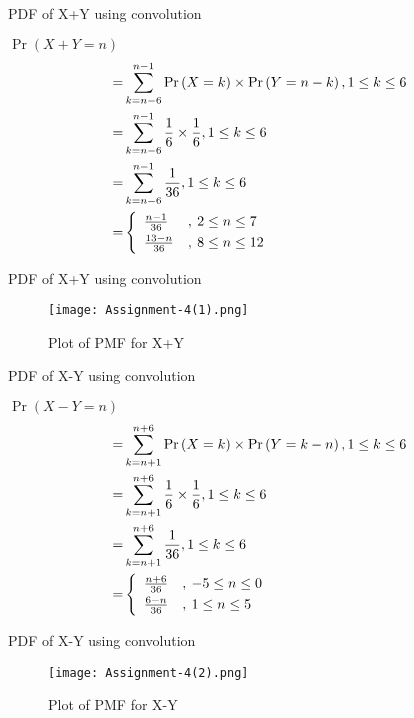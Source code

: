 \documentclass{beamer}
\providecommand{\brak}[1]{\ensuremath{\left(#1\right)}}
\begin{document}
\begin{frame}{PDF of X+Y using convolution}
    \begin{block}{}
        $\Pr\brak{X+Y=n}$
        \begin{align}
            =&\sum_{k=n-6}^{n-1} \Pr\brak{X=k}\times\Pr\brak{Y=n-k}, 1\leq k \leq 6\\
            =&\sum_{k=n-6}^{n-1} \frac{1}{6}\times\frac{1}{6}, 1\leq k \leq 6\\
            =&\sum_{k=n-6}^{n-1} \frac{1}{36}, 1\leq k \leq 6\\
            =&
            \left\{
	        \begin{array}{ll}
		        \frac{n-1}{36}  & ,\: 2 \leq n \leq 7 \smallskip\\
		        \frac{13-n}{36} & ,\: 8 \leq n \leq 12
	        \end{array}
            \right.\label{0.0.8}
        \end{align}
    \end{block}
\end{frame}
\begin{frame}{PDF of X+Y using convolution}
    \begin{figure}[htb]
        \texttt{[image: Assignment-4(1).png]}
        \caption{Plot of PMF for X+Y}
    \end{figure}
\end{frame}
\begin{frame}{PDF of X-Y using convolution}
    \begin{block}{}
        $\Pr\brak{X-Y=n}$
        \begin{align}
            =&\sum_{k=n+1}^{n+6} \Pr\brak{X=k}\times\Pr\brak{Y=k-n}, 1\leq k \leq 6\\
            =&\sum_{k=n+1}^{n+6} \frac{1}{6}\times\frac{1}{6}, 1\leq k \leq 6\\
            =&\sum_{k=n+1}^{n+6} \frac{1}{36}, 1\leq k \leq 6\\
            =&
            \left\{
	        \begin{array}{ll}
		        \frac{n+6}{36} & ,\: -5 \leq n \leq 0 \smallskip\\
		        \frac{6-n}{36} & ,\: 1  \leq n \leq 5
	        \end{array}
            \right.\label{0.0.12}
        \end{align}
    \end{block}
\end{frame}
\begin{frame}{PDF of X-Y using convolution}
    \begin{figure}[htb]
        \texttt{[image: Assignment-4(2).png]}
        \caption{Plot of PMF for X-Y}
    \end{figure}
\end{frame}
\end{document}
